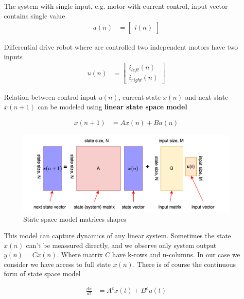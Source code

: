 \documentclass[12pt,twoside,onecolumn,openany,extrafontsizes,dvipsnames]{memoir}
\begin{document}
        The system with single input, e.g. motor with current control, input vector contains single value 
        \begin{align}
            u(n) &= \begin{bmatrix} i(n) \end{bmatrix}
        \end{align}

        Differential drive robot where are controlled two independent motors have two inputs 
        \begin{align}
            u(n) &= \begin{bmatrix} i_{left}(n) \\ i_{right}(n) \end{bmatrix}
        \end{align}

        Relation between control input $u(n)$, current state $x(n)$ and next state $x(n+1)$ can be 
        modeled using \textbf{linear state space model}
        
        \begin{align}
            x(n+1) &= Ax(n) + Bu(n)
        \end{align}

        \begin{figure}[!htb]
            \centering
            \includegraphics[scale=0.6]{../diagrams/control_generic/control_generic-discrete_dynamics.png}
            \caption{State space model matrices shapes}
            \label{fig:state_space_model_matrices_shapes}
        \end{figure}
        
        This model can capture dynamics of any linear system. Sometimes the state $x(n)$ can't be 
        meassured directly, and we observe only system output $y(n) = Cx(n)$. Where matrix $C$ have k-rows and n-columns.
        In our case we consider we have access to full state $x(n)$.
        There is of course the continuous form of state space model 

        \begin{align}
            \frac{dx}{dt} &= A^cx(t) + B^cu(t)
        \end{align}
\end{document}
